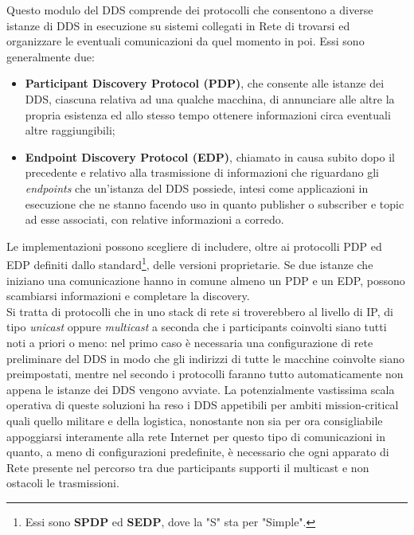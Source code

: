 \indent Questo modulo del DDS comprende dei protocolli che consentono a diverse istanze di DDS in esecuzione su sistemi collegati in Rete di trovarsi ed organizzare le eventuali comunicazioni da quel momento in poi. Essi sono generalmente due:
\begin{itemize}
    \item \textbf{Participant Discovery Protocol (PDP)}, che consente alle istanze dei DDS, ciascuna relativa ad una qualche macchina, di annunciare alle altre la propria esistenza ed allo stesso tempo ottenere informazioni circa eventuali altre raggiungibili;
    \newpage
    \item \textbf{Endpoint Discovery Protocol (EDP)}, chiamato in causa subito dopo il precedente e relativo alla trasmissione di informazioni che riguardano gli \emph{endpoints} che un'istanza del DDS possiede, intesi come applicazioni in esecuzione che ne stanno facendo uso in quanto publisher o subscriber e topic ad esse associati, con relative informazioni a corredo.
\end{itemize}
Le implementazioni possono scegliere di includere, oltre ai protocolli PDP ed EDP definiti dallo standard\footnote{Essi sono \textbf{SPDP} ed \textbf{SEDP}, dove la "S" sta per "Simple".}, delle versioni proprietarie. Se due istanze che iniziano una comunicazione hanno in comune almeno un PDP e un EDP, possono scambiarsi informazioni e completare la discovery.\\
Si tratta di protocolli che in uno stack di rete si troverebbero al livello di IP, di tipo \emph{unicast} oppure \emph{multicast} a seconda che i participants coinvolti siano tutti noti a priori o meno: nel primo caso è necessaria una configurazione di rete preliminare del DDS in modo che gli indirizzi di tutte le macchine coinvolte siano preimpostati, mentre nel secondo i protocolli faranno tutto automaticamente non appena le istanze dei DDS vengono avviate. La potenzialmente vastissima scala operativa di queste soluzioni ha reso i DDS appetibili per ambiti mission-critical quali quello militare e della logistica, nonostante non sia per ora consigliabile appoggiarsi interamente alla rete Internet per questo tipo di comunicazioni in quanto, a meno di configurazioni predefinite, è necessario che ogni apparato di Rete presente nel percorso tra due participants supporti il multicast e non ostacoli le trasmissioni.\vfill\newpage

